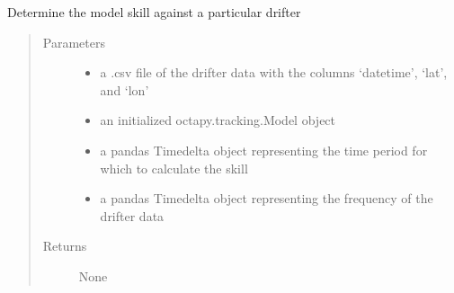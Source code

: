 \documentclass[letterpaper,10pt,english]{sphinxmanual}
\begin{document}
\begin{fulllineitems}
\label{\detokenize{octapy:octapy.tools.build_skill_release}}
\sphinxAtStartPar
Determine the model skill against a particular drifter
\begin{quote}\begin{description}
\item[{Parameters}] \leavevmode\begin{itemize}
\item {} 
\sphinxAtStartPar
{} \textendash{} a .csv file of the drifter data with the columns ‘datetime’, ‘lat’, and
‘lon’

\item {} 
\sphinxAtStartPar
{} \textendash{} an initialized octapy.tracking.Model object

\item {} 
\sphinxAtStartPar
{} \textendash{} a pandas Timedelta object representing the time period for which to
calculate the skill

\item {} 
\sphinxAtStartPar
{} \textendash{} a pandas Timedelta object representing the frequency of the drifter data

\end{itemize}

\item[{Returns}] \leavevmode
\sphinxAtStartPar
None

\end{description}\end{quote}

\end{fulllineitems}

\end{document}
